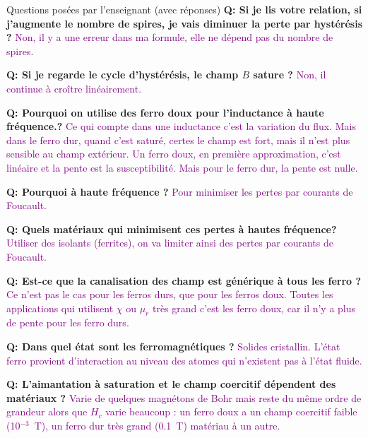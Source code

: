 \begin{reportBlock}{Questions posées par l’enseignant (avec réponses)}
  \textbf{Q: Si je lis votre relation, si j'augmente le nombre de spires, je vais diminuer la perte par hystérésis ?} \textcolor{purple}{Non, il y a une erreur dans ma formule, elle ne dépend pas du nombre de spires.} \newline
  
  \textbf{Q: Si je regarde le cycle d'hystérésis, le champ $B$ sature ?} \textcolor{purple}{Non, il continue à croître linéairement.} \newline
  
   \textbf{Q: Pourquoi on utilise des ferro doux pour l'inductance à haute fréquence.?} \textcolor{purple}{Ce qui compte dans une inductance c'est la variation du flux. Mais dans le ferro dur, quand c'est saturé, certes le champ est fort, mais il n'est plus sensible au champ extérieur. Un ferro doux, en première approximation, c'est linéaire et la pente est la susceptibilité. Mais pour le ferro dur, la pente est nulle.} \newline
  
  \textbf{Q: Pourquoi à haute fréquence ?} \textcolor{purple}{Pour minimiser les pertes par courants de Foucault.} \newline
  
   \textbf{Q: Quels matériaux qui minimisent ces pertes à hautes fréquence?} \textcolor{purple}{Utiliser des isolants (ferrites), on va limiter ainsi des pertes par courants de Foucault.} \newline
  
  \textbf{Q: Est-ce que la canalisation des champ est générique à tous les ferro ?} \textcolor{purple}{Ce n'est pas le cas pour les ferros durs, que pour les ferros doux. Toutes les applications qui utilisent $\chi$ ou $\mu_r$ très grand c'est les ferro doux, car il n'y a plus de pente pour les ferro durs.} \newline
  
   \textbf{Q: Dans quel état sont les ferromagnétiques ?} \textcolor{purple}{Solides cristallin. L'état ferro provient d'interaction au niveau des atomes qui n'existent pas à l'état fluide.} \newline
  
  \textbf{Q: L'aimantation à saturation et le champ coercitif dépendent des matériaux ?} \textcolor{purple}{Varie de quelques magnétons de Bohr mais reste du même ordre de grandeur alors que $H_c$ varie beaucoup : un ferro doux a un champ coercitif faible (10$^{-3}$~T), un ferro dur très grand (0.1~T) matériau à un autre.} \newline
  

\end{reportBlock}
